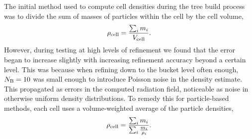 \documentclass[fleq,usenatbib]{mnras}
\begin{document}
{The initial method used to compute cell densities during the tree build 
process was to divide the sum of masses of particles within the cell by the 
cell volume, 
\begin{equation}
\rho_{\rm cell} = \frac{\sum_i m_i}{V_{\rm cell}}.
\end{equation}
However, during testing at high levels of refinement we found that the error 
began to increase slightly with increasing refinement accuracy beyond a 
certain level. This was because when refining down to the bucket level often 
enough, $N_{\rm B}=10$ was small enough to introduce Poisson noise in the 
density estimate.  This propagated as errors in the computed radiation field, 
noticeable as noise in otherwise uniform density distributions. To remedy this 
for particle-based methods, each cell uses a volume-weighted average of the particle  
densities,
\begin{equation}
\rho_{\rm cell} = \frac{\sum_i m_i}{\sum_i{\frac{m_i}{\rho_i}}}.
\end{equation}

}
\end{document}
